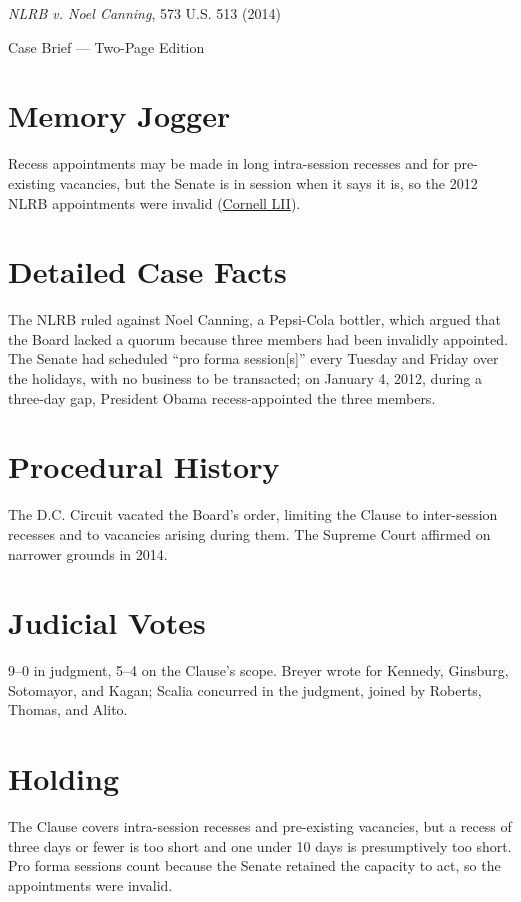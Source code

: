 \documentclass[12pt]{article}
\begin{document}
\begin{center}
{\LARGE \textit{NLRB v. Noel Canning}, 573 U.S. 513 (2014)\par}
\vspace{0.5em}
{\large Case Brief --- Two-Page Edition\par}
\end{center}

\section{Memory Jogger}
Recess appointments may be made in long intra-session recesses and for pre-existing vacancies, but the Senate is in session when it says it is, so the 2012 NLRB appointments were invalid (\href{https://www.law.cornell.edu/supremecourt/text/12-1281}{Cornell LII}).

\section{Detailed Case Facts}
The NLRB ruled against Noel Canning, a Pepsi-Cola bottler, which argued that the Board lacked a quorum because three members had been invalidly appointed. The Senate had scheduled ``pro forma session[s]'' every Tuesday and Friday over the holidays, with no business to be transacted; on January 4, 2012, during a three-day gap, President Obama recess-appointed the three members.

\section{Procedural History}
The D.C. Circuit vacated the Board's order, limiting the Clause to inter-session recesses and to vacancies arising during them. The Supreme Court affirmed on narrower grounds in 2014.

\section{Judicial Votes}
9--0 in judgment, 5--4 on the Clause's scope. Breyer wrote for Kennedy, Ginsburg, Sotomayor, and Kagan; Scalia concurred in the judgment, joined by Roberts, Thomas, and Alito.

\section{Holding}
The Clause covers intra-session recesses and pre-existing vacancies, but a recess of three days or fewer is too short and one under 10 days is presumptively too short. Pro forma sessions count because the Senate retained the capacity to act, so the appointments were invalid.
\end{document}
